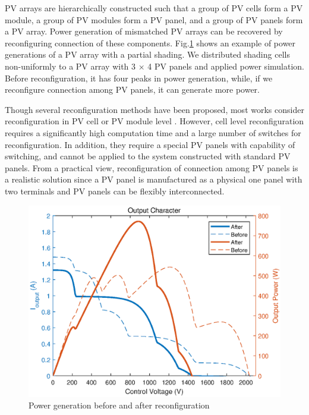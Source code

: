 \documentclass[conference]{IEEEtran}
\begin{document}
PV arrays are hierarchically constructed such that a group of PV cells form a PV module, a group of PV modules form a PV panel, and a group of PV panels form a PV array. Power generation of mismatched PV arrays can be recovered by reconfiguring connection of these components. 
Fig.\ref{compare} shows an example of power generations of a PV array with a partial shading. We distributed shading cells non-uniformly to a PV array with 
3 $\times$ 4 PV panels
and applied power simulation. Before reconfiguration, it has four peaks in power generation, while, if we reconfigure connection among PV panels, it can generate more power. 


Though several reconfiguration methods have been proposed, most works consider reconfiguration in PV cell or PV module level \cite{nguyen2008adaptive,wang2014architecture,storey2013improved,storey2014optimized,udenze2018reconfiguration}. 
However, cell level reconfiguration requires a significantly high computation time and a large number of switches for reconfiguration. In addition, they require a special PV panels with capability of switching, and cannot be applied to the system constructed with standard PV panels. From a practical view, reconfiguration of connection among PV panels is a realistic solution since a PV panel is manufactured as a physical one panel with two terminals and PV panels can be flexibly interconnected. 

\begin{figure}[t]
    \centering
    \includegraphics[width=0.8\linewidth]{fig/new_compare.eps}
    \caption{Power generation before and after reconfiguration}
    \label{compare}
\end{figure}
\end{document}
